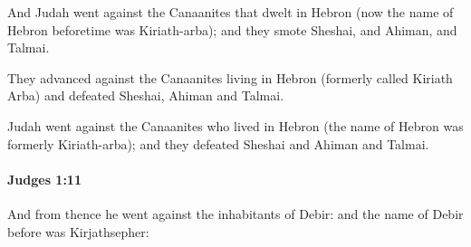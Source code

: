 			\begin{versebox}
					\item[BHS] 
					\item[ASV] And Judah went against the Canaanites that dwelt in Hebron (now the name of Hebron beforetime was Kiriath-arba); and they smote Sheshai, and Ahiman, and Talmai.
					\item[NIV] They advanced against the Canaanites living in Hebron (formerly called Kiriath Arba) and defeated Sheshai, Ahiman and Talmai.
					\item[NRSV] Judah went against the Canaanites who lived in Hebron (the name of Hebron was formerly Kiriath-arba); and they defeated Sheshai and Ahiman and Talmai.
			\end{versebox}

		\paragraph{Judges 1:11} %
			\label{JUDGES-1-11}

			And from thence he went against the inhabitants of Debir: and the name of Debir before was Kirjathsepher:

